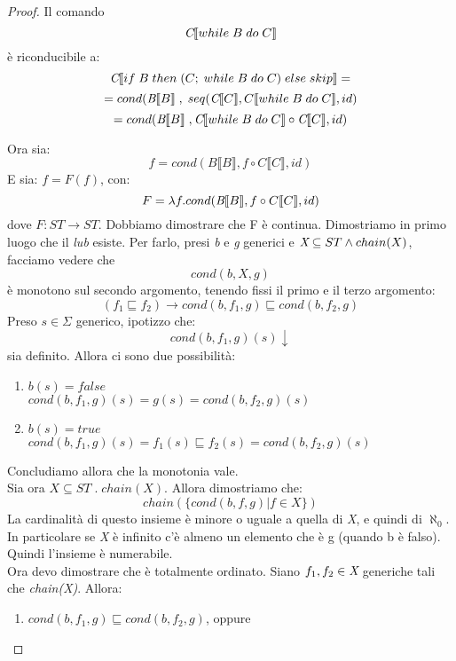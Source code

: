 \begin{proof}

  Il comando $$\emph{C}\llbracket while\; B\; do\; C \rrbracket $$ è riconducibile a:
  $$ \emph{C}\llbracket if\; B\; then\; (C;\; while\; B\; do\; C)\; else\; skip \rrbracket = $$
  $$ = cond( \emph{B}\llbracket B \rrbracket\; ,\; seq(\emph{C}\llbracket C \rrbracket , C \llbracket \\ while\; B\; do\; C \rrbracket , id ) $$
  $$ = cond( \emph{B}\llbracket B \rrbracket\;, \emph{C}\llbracket while\; B\; do\; C \rrbracket \circ \emph{C}\llbracket C \rrbracket , id) $$

  Ora sia:
  $$ f = cond(B \llbracket B \rrbracket , f \circ C \llbracket C \rrbracket , id) $$
  E sia:
  $ f = F(f) $, con:
  $$ F = \lambda f . cond(\emph{B} \llbracket B \rrbracket , f \circ C \llbracket C \rrbracket , id) $$
  dove $ F: ST \rightarrow ST $. Dobbiamo dimostrare che F è continua. Dimostriamo in primo luogo che il \emph{lub} esiste. Per farlo, presi \emph{b} e \emph{g} generici e $ \emph{X} \subseteq ST \land chain(X) $, facciamo vedere che $$ cond(b,X,g) $$ è monotono sul secondo argomento, tenendo fissi il primo e il terzo argomento:
  $$ (f_1 \sqsubseteq f_2) \rightarrow cond(b,f_{1},g) \sqsubseteq cond(b,f_{2},g) $$
  Preso $s \in \Sigma $ generico, ipotizzo che:
  $$ cond(b,f_1,g)(s) \downarrow $$
  sia definito. Allora ci sono due possibilità:
  \begin{enumerate}
  \item $ b(s) = false $ \\
    $ cond(b,f_1,g)(s)=g(s)=cond(b,f_2,g)(s) $
  \item $ b(s) = true $ \\
    $ cond(b,f_1,g)(s) = f_{1}(s) \sqsubseteq f_{2}(s) = cond(b,f_2,g)(s) $
  \end{enumerate}
  Concludiamo allora che la monotonia vale. \\
  Sia ora $ X \subseteq ST \; . \; chain(X) $. Allora dimostriamo che:
  $$ chain( \{cond(b,f,g) | f \in X\}) $$
  La cardinalità di questo insieme è minore o uguale a quella di \emph{X}, e quindi di $ \aleph_0 $. In particolare se \emph{X} è infinito c'è almeno un elemento che è g (quando b è falso). Quindi l'insieme è numerabile. \\ Ora devo dimostrare che è totalmente ordinato. Siano $f_1,f_2 \in \emph{X}$ generiche tali che \emph{chain(X)}. Allora:
  \begin{enumerate}
  \item $cond(b,f_1,g) \sqsubseteq cond(b,f_2,g)$, oppure

\end{enumerate}
\end{proof}
